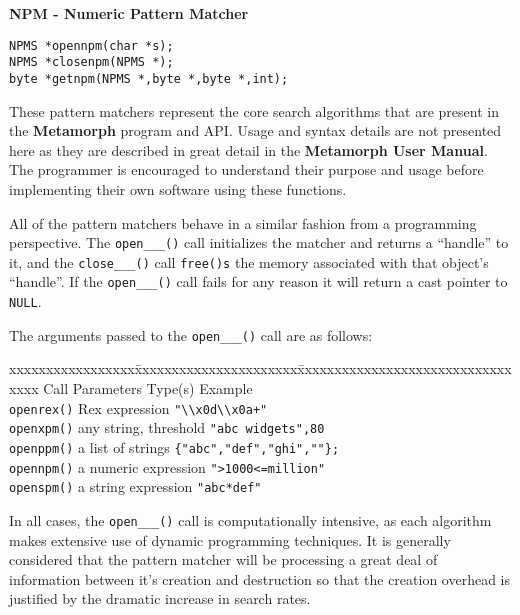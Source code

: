 {\bf NPM - Numeric Pattern Matcher }
\begin{verbatim}
NPMS *opennpm(char *s);
NPMS *closenpm(NPMS *);
byte *getnpm(NPMS *,byte *,byte *,int);

\end{verbatim}

\DESCRIPTION

These pattern matchers represent the core search algorithms that are
present in the {\bf Metamorph} program and API.  Usage and syntax details
are not presented here as they are described in great detail in the
{\bf Metamorph User Manual}.  The programmer is encouraged to understand
their purpose and usage before implementing their own software using these
functions.

All of the pattern matchers behave in a similar fashion from a programming
perspective.  The \verb`open___()` call initializes the matcher and
returns a ``handle'' to it, and the \verb`close___()` call \verb`free()s`
the memory associated with that object's ``handle''.  If the \verb`open___()`
call fails for any reason it will return a cast pointer to \verb`NULL`.

The arguments passed to the \verb`open___()` call are as follows:
\begin{tabbing}
xxxxxxxxxxxxxxxxx\=xxxxxxxxxxxxxxxxxxxxxx\=xxxxxxxxxxxxxxxxxxxxxxxxxxxxxxxxx\kill
Call             \>Parameters Type(s)    \> Example                         \\
\verb`openrex()` \>Rex expression        \> \verb`"\\x0d\\x0a+"`            \\
\verb`openxpm()` \>any string, threshold \> \verb`"abc widgets",80`         \\
\verb`openppm()` \>a list of strings     \> \verb`{"abc","def","ghi",""};`  \\
\verb`opennpm()` \>a numeric expression  \> \verb`">1000<=million"`         \\
\verb`openspm()` \>a string expression   \> \verb`"abc*def"`                \\
\end{tabbing}

In all cases, the \verb`open___()` call is computationally intensive, as
each algorithm makes extensive use of dynamic programming techniques.  It
is generally considered that the pattern matcher will be processing a
great deal of information between it's creation and destruction so that
the creation overhead is justified by the dramatic increase in search
rates.

